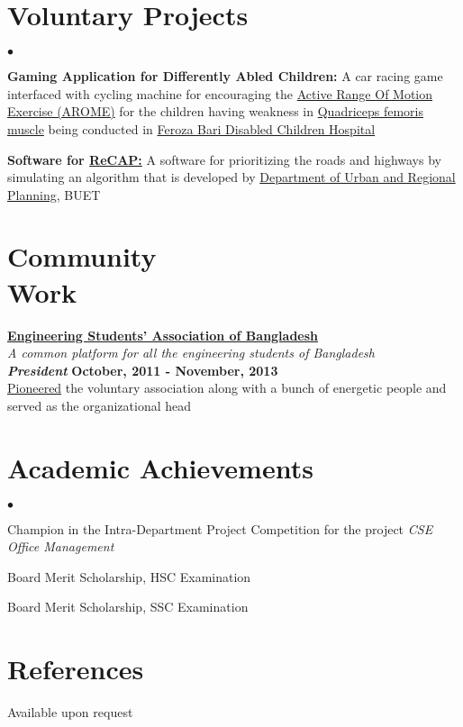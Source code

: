 \documentclass[margin,line]{res}
\newenvironment{list2}{
  \begin{list}{$\bullet$}{%
      \setlength{\itemsep}{0in}
      \setlength{\parsep}{0in} \setlength{\parskip}{0in}
      \setlength{\topsep}{0in} \setlength{\partopsep}{0in} 
      \setlength{\leftmargin}{0.2in}}}{\end{list}}
\begin{document}
\begin{resume}
\section{\sc Voluntary Projects}
\begin{list2}
\item {\bf {Gaming Application for Differently Abled Children:}} A car racing game interfaced with cycling machine for encouraging the \href{http://www.physiotherapynotes.com/2011/07/physiotherapy-exercises-types.html}{Active Range Of Motion Exercise (AROME)} for the children having weakness in \href{https://en.wikipedia.org/wiki/Quadriceps_femoris_muscle}{Quadriceps femoris muscle} being conducted in \href{http://www.bccw-bd.org/information_about.html}{Feroza Bari Disabled Children Hospital}
\item {\bf Software for \href{http://www.research4cap.org/SitePages/Home.aspx}{ReCAP:}} A software for prioritizing the roads and highways by simulating an algorithm that is developed by \href{http://urp.buet.ac.bd/}{Department of Urban and Regional Planning}, BUET
\end{list2}

\vspace*{-.1in}

\section{\sc Community \\Work}
{\bf \href{http://www.esab.org.bd/}{Engineering Students' Association of Bangladesh}} \\
\textit{A common platform for all the engineering students of Bangladesh \\}
\textbf{{\em President}} \hfill {\bf October, 2011 - November, 2013}\\
\href{https://www.youtube.com/watch?v=2GRKcrF47gM}{Pioneered} the voluntary association along with a bunch of energetic people and served as the organizational head

\vspace*{-.1in}

\section{\sc Academic Achievements} 
\begin{list2}
\item Champion in the Intra-Department Project Competition for the project \textit{CSE Office Management}
\item Board Merit Scholarship, HSC Examination
\item Board Merit Scholarship, SSC Examination
\end{list2}

\vspace*{-.1in}

\section{\sc References} 
Available upon request

\end{resume}
\end{document}
